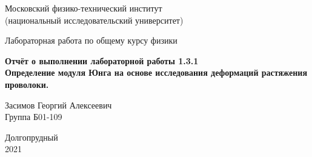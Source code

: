 



\begin{titlepage}

    \newpage
    \begin{center}
        \normalsize Московский физико-технический институт \\(национальный исследовательский университет)
    \end{center}

    \vspace{6em}

    \begin{center}
        \Large Лабораторная работа по общему курсу физики\\
    \end{center}

    \vspace{1em}

    \begin{center}
        \Large \textbf{Отчёт о выполнении лабораторной работы 1.3.1\\ {Определение модуля Юнга на основе исследования деформаций растяжения проволоки.}}
    \end{center}

    \vspace{2em}

    \begin{center}
        \large Засимов Георгий Алексеевич \\
        Группа Б01-109
    \end{center}

    \vspace{\fill}

    \begin{center}
    Долгопрудный \\2021
    \end{center}
    
\end{titlepage}

\newpage

